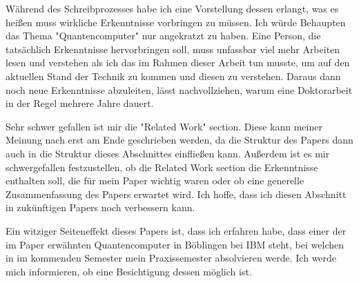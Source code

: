\documentclass{scrarticle}
\begin{document}
Während des Schreibprozesses habe ich eine Vorstellung dessen erlangt, was es heißen muss wirkliche Erkenntnisse vorbringen zu müssen. Ich würde Behaupten das Thema "Quantencomputer" nur angekratzt zu haben. Eine Person, die tatsächlich Erkenntnisse hervorbringen soll, muss unfassbar viel mehr Arbeiten lesen und verstehen als ich das im Rahmen dieser Arbeit tun musste, um auf den aktuellen Stand der Technik zu kommen und diesen zu verstehen. Daraus dann noch neue Erkenntnisse abzuleiten, lässt nachvollziehen, warum eine Doktorarbeit in der Regel mehrere Jahre dauert. 

Sehr schwer gefallen ist mir die "Related Work" section. Diese kann meiner Meinung nach erst am Ende geschrieben werden, da die Struktur des Papers dann auch in die Struktur dieses Abschnittes einfließen kann. Außerdem ist es mir schwergefallen festzustellen, ob die Related Work section die Erkenntnisse enthalten soll, die für mein Paper wichtig waren oder ob eine generelle Zusammenfassung des Papers erwartet wird. Ich hoffe, dass ich diesen Abschnitt in zukünftigen Papers noch verbessern kann.

Ein witziger Seiteneffekt dieses Papers ist, dass ich erfahren habe, dass einer der im Paper erwähnten Quantencomputer in Böblingen bei IBM steht, bei welchen in im kommenden Semester mein Praxissemester absolvieren werde. Ich werde mich informieren, ob eine Besichtigung dessen möglich ist.
\end{document}
